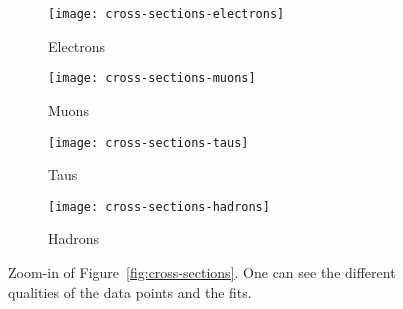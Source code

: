 \begin{figure}
    \centering
    \begin{subfigure}[c]{0.48\linewidth}
        \centering
        \texttt{[image: cross-sections-electrons]}
        \caption{%
            Electrons
        }
        \label{fig:cross-sections-zoom/electrons}
    \end{subfigure}
    \hfill
    \begin{subfigure}[c]{0.48\linewidth}
        \centering
        \texttt{[image: cross-sections-muons]}
        \caption{%
            Muons
        }
        \label{fig:cross-sections-zoom/muons}
    \end{subfigure}

    \vspace{2ex}

    \begin{subfigure}[c]{0.48\linewidth}
        \centering
        \texttt{[image: cross-sections-taus]}
        \caption{%
            Taus
        }
        \label{fig:cross-sections-zoom/taus}
    \end{subfigure}
    \hfill
    \begin{subfigure}[c]{0.48\linewidth}
        \centering
        \texttt{[image: cross-sections-hadrons]}
        \caption{%
            Hadrons
        }
        \label{fig:cross-sections-zoom/hadrons}
    \end{subfigure}

    \caption{%
        Zoom-in of Figure~\ref{fig:cross-sections}. One can see the different
        qualities of the data points and the fits.
    }
    \label{fig:cross-sections-zoom}
\end{figure}
